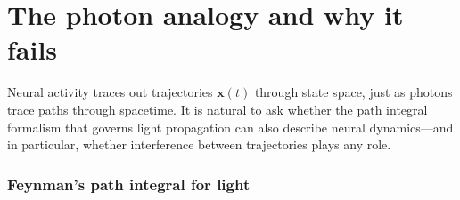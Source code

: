 \documentclass[11pt,a4paper]{article}
\begin{document}
\part{The photon analogy and why it fails}

Neural activity traces out trajectories $\mathbf{x}(t)$ through state space, 
just as photons trace paths through spacetime. It is natural to ask whether 
the path integral formalism that governs light propagation can also describe 
neural dynamics---and in particular, whether interference between trajectories 
plays any role.

\section{Feynman's path integral for light}
\label{sec:feynman}
\end{document}
